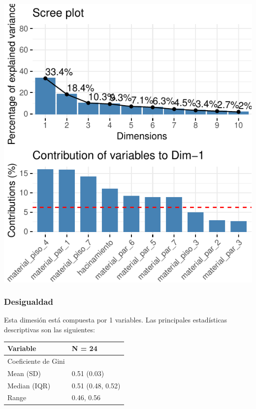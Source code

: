 \includegraphics{Anexo_PCA_files/figure-latex/unnamed-chunk-1-4.pdf}

\hypertarget{desigualdad}{%
\subsubsection{Desigualdad}\label{desigualdad}}

Esta dimesión está compuesta por 1 variables. Las principales
estadísticas descriptivas son las siguientes:

\begin{table}
\centering\begingroup\fontsize{7}{9}\selectfont

\begin{tabular}{ll}
\toprule
Variable & N = 24\\
\midrule
Coeficiente de Gini & \\
\hspace{1em}Mean (SD) & 0.51 (0.03)\\
\hspace{1em}Median (IQR) & 0.51 (0.48, 0.52)\\
\hspace{1em}Range & 0.46, 0.56\\
\bottomrule
\end{tabular}
\endgroup{}
\end{table}

